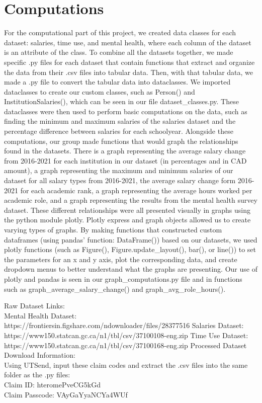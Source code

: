 \documentclass{article}
\begin{document}
\section{Computations}
For the computational part of this project, we created data classes for each dataset: salaries, time use, and mental health, where each column of the dataset is an attribute of the class. To combine all the datasets together, we made specific .py files for each dataset that contain functions that extract and organize the data from their .csv files into tabular data. Then, with that tabular data, we made a .py file to convert the tabular data into dataclasses. We imported dataclasses to create our custom classes, such as Person() and InstitutionSalaries(), which can be seen in our file dataset\_classes.py. These dataclasses were then used to perform basic computations on the data, such as finding the minimum and maximum salaries of the salaries dataset and the percentage difference between salaries for each schoolyear. Alongside these computations, our group made functions that would graph the relationships found in the datasets. There is a graph representing the average salary change from 2016-2021 for each institution in our dataset (in percentages and in CAD amount), a graph representing the maximum and minimum salaries of our dataset for all salary types from 2016-2021, the average salary change form 2016-2021 for each academic rank, a graph representing the average hours worked per academic role, and a graph representing the results from the mental health survey dataset. These different relationships were all presented visually in graphs using the python module plotly. Plotly express and graph objects allowed us to create varying types of graphs. By making functions that constructed custom dataframes (using pandas' function: DataFrame()) based on our datasets, we used plotly functions (such as Figure(), Figure.update\_layout(), bar(), or line()) to  set the parameters for an x and y axis, plot the corresponding data, and create dropdown menus to better understand what the graphs are presenting. Our use of plotly and pandas is seen in our graph\_computations.py file and in functions such as graph\_average\_salary\_change() and graph\_avg\_role\_hours().
\hfill \break

Raw Dataset Links:\\
Mental Health Dataset: https://frontiersin.figshare.com/ndownloader/files/28377516
Salaries Dataset: https://www150.statcan.gc.ca/n1/tbl/csv/37100108-eng.zip
Time Use Dataset: https://www150.statcan.gc.ca/n1/tbl/csv/37100168-eng.zip
\hfill \break
Processed Dataset Download Information:\\
Using UTSend, input these claim codes and extract the .csv files into the same folder as the .py files:\\
Claim ID: hteromePveCG5kGd\\
Claim Passcode: VAyGaYyaNCYa4WUf
\hfill \break
\end{document}
